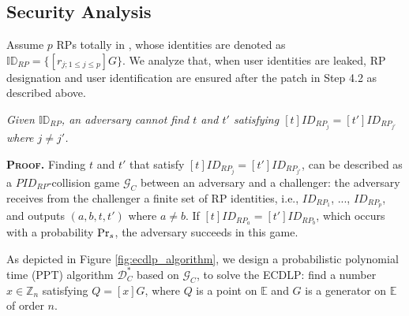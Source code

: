 \subsection{Security Analysis}
\label{proof-rp-collision}

Assume $p$ RPs totally in \usso,
    whose identities are denoted as $\mathbb{ID}_{RP} = \{[r_{j; 1 \leq j \leq p}]G\}$.
We analyze that, when user identities are leaked,
    RP designation and user identification are ensured after the patch in Step 4.2 as described above.

\vspace{-1mm}
\begin{lemma}
\emph{Given $\mathbb{ID}_{RP}$, an adversary cannot find $t$ and $t'$ satisfying $[t]ID_{RP_j} = [t']ID_{RP_{j'}}$ where $j \neq j'$.}\label{thm-rp-collision}
\end{lemma}
\vspace{-1mm}

\noindent\textbf{\textsc{Proof.}} 
Finding $t$ and $t'$ that satisfy $[t]ID_{RP_j} = [t']ID_{RP_{j'}}$, can be described as a $PID_{RP}$-collision game $\mathcal{G}_C$ between an adversary and a challenger: the adversary receives from the challenger a finite set of RP identities, i.e., $ID_{RP_1}$, ..., $ID_{RP_p}$, and outputs $(a, b, t, t')$ where $a \neq b$. If $[t]ID_{RP_a}=[t']ID_{RP_b}$, which occurs with a probability ${\rm Pr}_s$, the adversary succeeds in this game.

As depicted in Figure \ref{fig:ecdlp_algorithm}, we design a probabilistic polynomial time (PPT) algorithm $\mathcal{D}^*_C$ based on $\mathcal{G}_C$, to solve the ECDLP: find a number $x \in \mathbb{Z}_n$ satisfying $Q = [x]G$, where $Q$ is a point on $\mathbb{E}$ and $G$ is a generator on $\mathbb{E}$ of order $n$.

